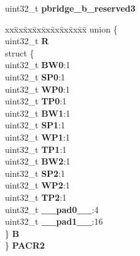 \begin{DoxyCompactItemize}
\begin{tabbing}
\end{tabbing}\item 
\mbox{\label{structPBRIDGE__B__tag_a9a878fe43015ea21bcfdbe1ce07f5e54}} 
uint32\+\_\+t {\bfseries pbridge\+\_\+b\+\_\+reserved3}
\item 
\mbox{\label{structPBRIDGE__B__tag_aafd3d442425473a4521da0512277375b}} 
\begin{tabbing}
xx\=xx\=xx\=xx\=xx\=xx\=xx\=xx\=xx\=\kill
union \{\\
\>uint32\_t {\bfseries R}\\
\>struct \{\\
\>\>uint32\_t {\bfseries BW0}:1\\
\>\>uint32\_t {\bfseries SP0}:1\\
\>\>uint32\_t {\bfseries WP0}:1\\
\>\>uint32\_t {\bfseries TP0}:1\\
\>\>uint32\_t {\bfseries BW1}:1\\
\>\>uint32\_t {\bfseries SP1}:1\\
\>\>uint32\_t {\bfseries WP1}:1\\
\>\>uint32\_t {\bfseries TP1}:1\\
\>\>uint32\_t {\bfseries BW2}:1\\
\>\>uint32\_t {\bfseries SP2}:1\\
\>\>uint32\_t {\bfseries WP2}:1\\
\>\>uint32\_t {\bfseries TP2}:1\\
\>\>uint32\_t {\bfseries \_\_pad0\_\_}:4\\
\>\>uint32\_t {\bfseries \_\_pad1\_\_}:16\\
\>\} {\bfseries B}\\
\} {\bfseries PACR2}\\


\end{tabbing}
\end{DoxyCompactItemize}
